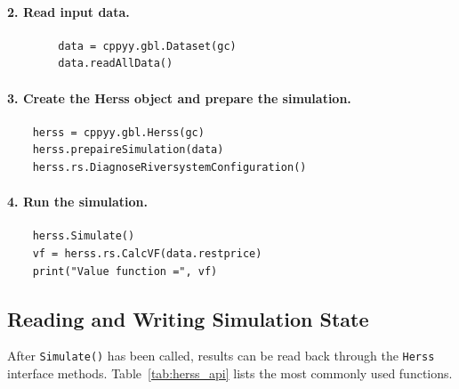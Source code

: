 \documentclass[a4paper, 12pt]{report}
\begin{document}
	\paragraph{2. Read input data.}
	\begin{verbatim}
		data = cppyy.gbl.Dataset(gc)
		data.readAllData()
	\end{verbatim}

	\paragraph{3. Create the Herss object and prepare the simulation.}
	\begin{verbatim}
	herss = cppyy.gbl.Herss(gc)
	herss.prepaireSimulation(data)
	herss.rs.DiagnoseRiversystemConfiguration()
	\end{verbatim}

	\paragraph{4. Run the simulation.}
	\begin{verbatim}
	herss.Simulate()
	vf = herss.rs.CalcVF(data.restprice)
	print("Value function =", vf)
	\end{verbatim}

	\subsection{Reading and Writing Simulation State}

	After \texttt{Simulate()} has been called, results can be read back through
	the \texttt{Herss} interface methods. Table~\ref{tab:herss_api} lists the
	most commonly used functions.
\end{document}
